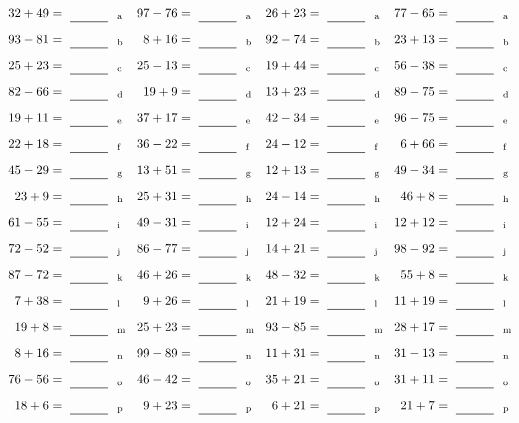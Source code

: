 \documentclass
[
  draft    = true,
  fontsize = 11pt,
  parskip  = half-
]
{scrartcl}
\begin{document}
\clearpage
\begin{align*}
    \pline{32+49}&=\rline{a}
  & \pline{97-76}&=\rline{a}
  & \pline{26+23}&=\rline{a}
  & \pline{77-65}&=\rline{a} \\[1ex]
    \pline{93-81}&=\rline{b}
  & \pline{8+16}&=\rline{b}
  & \pline{92-74}&=\rline{b}
  & \pline{23+13}&=\rline{b} \\[1ex]
    \pline{25+23}&=\rline{c}
  & \pline{25-13}&=\rline{c}
  & \pline{19+44}&=\rline{c}
  & \pline{56-38}&=\rline{c} \\[1ex]
    \pline{82-66}&=\rline{d}
  & \pline{19+9}&=\rline{d}
  & \pline{13+23}&=\rline{d}
  & \pline{89-75}&=\rline{d} \\[1ex]
    \pline{19+11}&=\rline{e}
  & \pline{37+17}&=\rline{e}
  & \pline{42-34}&=\rline{e}
  & \pline{96-75}&=\rline{e} \\[1ex]
    \pline{22+18}&=\rline{f}
  & \pline{36-22}&=\rline{f}
  & \pline{24-12}&=\rline{f}
  & \pline{6+66}&=\rline{f} \\[1ex]
    \pline{45-29}&=\rline{g}
  & \pline{13+51}&=\rline{g}
  & \pline{12+13}&=\rline{g}
  & \pline{49-34}&=\rline{g} \\[1ex]
    \pline{23+9}&=\rline{h}
  & \pline{25+31}&=\rline{h}
  & \pline{24-14}&=\rline{h}
  & \pline{46+8}&=\rline{h} \\[1ex]
    \pline{61-55}&=\rline{i}
  & \pline{49-31}&=\rline{i}
  & \pline{12+24}&=\rline{i}
  & \pline{12+12}&=\rline{i} \\[1ex]
    \pline{72-52}&=\rline{j}
  & \pline{86-77}&=\rline{j}
  & \pline{14+21}&=\rline{j}
  & \pline{98-92}&=\rline{j} \\[1ex]
    \pline{87-72}&=\rline{k}
  & \pline{46+26}&=\rline{k}
  & \pline{48-32}&=\rline{k}
  & \pline{55+8}&=\rline{k} \\[1ex]
    \pline{7+38}&=\rline{l}
  & \pline{9+26}&=\rline{l}
  & \pline{21+19}&=\rline{l}
  & \pline{11+19}&=\rline{l} \\[1ex]
    \pline{19+8}&=\rline{m}
  & \pline{25+23}&=\rline{m}
  & \pline{93-85}&=\rline{m}
  & \pline{28+17}&=\rline{m} \\[1ex]
    \pline{8+16}&=\rline{n}
  & \pline{99-89}&=\rline{n}
  & \pline{11+31}&=\rline{n}
  & \pline{31-13}&=\rline{n} \\[1ex]
    \pline{76-56}&=\rline{o}
  & \pline{46-42}&=\rline{o}
  & \pline{35+21}&=\rline{o}
  & \pline{31+11}&=\rline{o} \\[1ex]
    \pline{18+6}&=\rline{p}
  & \pline{9+23}&=\rline{p}
  & \pline{6+21}&=\rline{p}
  & \pline{21+7}&=\rline{p}
\end{align*}
\end{document}
